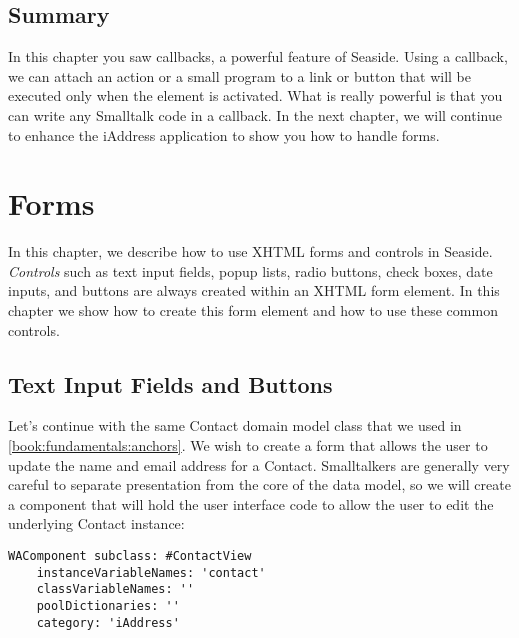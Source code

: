\documentclass[a4paper,10pt,twoside]{book}
\newcommand{\ct}[1]{{\small\ttfamily\textup{#1}}}
\begin{document}
\section{Summary}
\label{book:fundamentals:anchors:summary}

In this chapter you saw callbacks, a powerful feature of Seaside. Using a callback, we can attach an action or a small program to a link or button that will be executed only when the element is activated. What is really powerful is that you can write any Smalltalk code in a callback. In the next chapter, we will continue to enhance the iAddress application to show you how to handle forms.

\chapter{Forms}
\label{book:fundamentals:forms}


In this chapter, we describe how to use XHTML forms and controls in Seaside. \textit{Controls} such as text input fields, popup lists, radio buttons, check boxes, date inputs, and buttons are always created within an XHTML \ct{form} element. In this chapter we show how to create this \ct{form} element and how to use these common controls.

\section{Text Input Fields and Buttons}
\label{book:fundamentals:forms:textinputfields}


Let's continue with the same \ct{Contact} domain model class that we used in \autoref{book:fundamentals:anchors}. We wish to create a form that allows the user to update the name and email address for a \ct{Contact}. Smalltalkers are generally very careful to separate presentation from the core of the data model, so we will create a component that will hold the user interface code to allow the user to edit the underlying \ct{Contact} instance:

\begin{lstlisting}
WAComponent subclass: #ContactView
    instanceVariableNames: 'contact'
    classVariableNames: ''
    poolDictionaries: ''
    category: 'iAddress'
\end{lstlisting}
\end{document}
